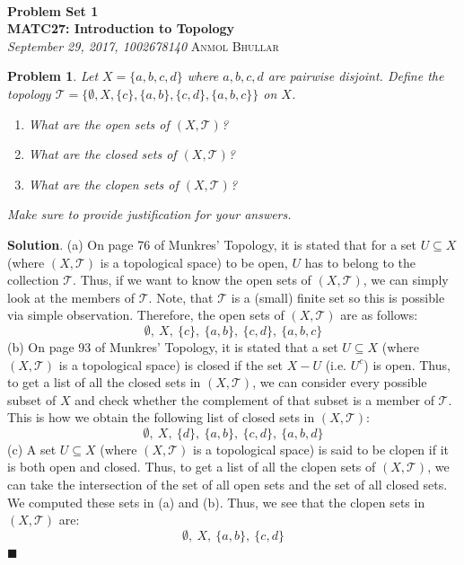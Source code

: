 \documentclass[12pt]{article}
\renewcommand{\=}[1]{\stackrel{#1}{=}} %
\providecommand{\T}{\mathcal{T}}
\newtheorem{p}{Problem}[section]
\theoremstyle{definition}
\newenvironment{s}{%
        \begin{trivlist} \item \textbf{Solution}. }{%
            \hspace*{\fill} $\blacksquare$\end{trivlist}}%
\begin{document}
{\noindent\Huge\bf  \\[0.5\baselineskip] {\selectfont  %
Problem Set 1}         }\\[2\baselineskip] %
{ {\bf {}\selectfont MATC27: Introduction to Topology}\\ {\textit{%
\selectfont September 29, 2017, 1002678140}}}
{\large \textsc{Anmol Bhullar}} %
\\[1.4\baselineskip]

\begin{p}
    Let $X = \{a,b,c,d\}$ where $a,b,c,d$ are pairwise disjoint. Define the topology
    $\mathcal{T} = \{\emptyset, X, \{c\}, \{a,b\}, \{c,d\}, \{a,b,c\}\}$ on $X$.
    \begin{enumerate}
        \item What are the open sets of $(X,\mathcal{T})$?
        \item What are the closed sets of $(X,\T)$?
        \item What are the clopen sets of $(X,\T)$?
    \end{enumerate}
    Make sure to provide justification for your answers.
\end{p}
\begin{s}
    (a) On page 76 of Munkres' Topology, it is stated that for a set $U\subseteq X$ (where $(X,\T)$ is a topological space) to be open, 
    $U$ has to belong to the collection $\T$. Thus, if we want to know the open sets of $(X,\T)$, we can simply look at the members
    of $\T$. Note, that $\T$ is a (small) finite set so this is possible via simple observation. Therefore, the open sets of $(X,\T)$ are as follows:
    \[ \emptyset,\: X,\: \{c\},\: \{a,b\},\: \{c,d\},\: \{a,b,c\} \]
    (b) On page 93 of Munkres' Topology, it is stated that a set $U\subseteq X$ (where $(X,\T)$ is a topological space) is closed if the
    set $X - U$ (i.e. $U^{c}$) is open. Thus, to get a list of all the closed sets in $(X,\T)$, 
    we can consider every possible subset of $X$ and check whether the complement of that subset is a member of $\T$. This is how 
    we obtain the following list of closed sets in $(X,\T)$:
    \[ \emptyset,\: X,\: \{d\},\: \{a,b\},\: \{c,d\},\: \{a,b,d\} \]
    (c) A set $U\subseteq X$ (where $(X,\T)$ is a topological space) is said to be clopen if it is both open and closed. Thus, to get
    a list of all the clopen sets of $(X,\T)$, we can take the intersection of the set of all open sets and the set of all closed sets.
    We computed these sets in (a) and (b). Thus, we see that the clopen sets in $(X,\T)$ are:
    \[ \emptyset,\: X,\: \{a,b\},\: \{c,d\} \]
\end{s}
\end{document}
